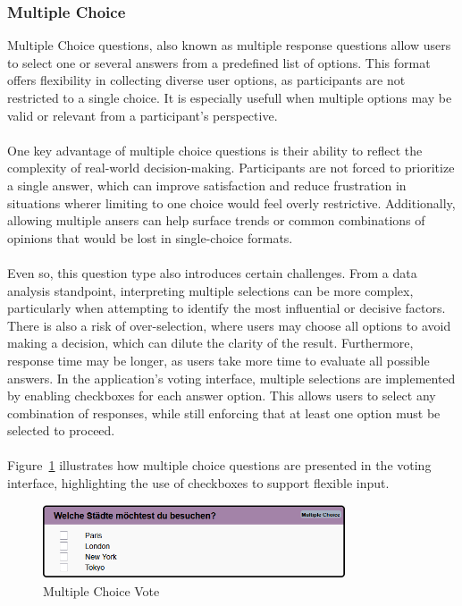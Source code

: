 \documentclass[a4paper,12pt]{report}
\begin{document}
\subsubsection{Multiple Choice}
Multiple Choice questions, also known as multiple response questions allow users to select one or several answers from a predefined list of options. This format offers flexibility in collecting diverse user options, as participants are not restricted to a single choice. It is especially usefull when multiple options may be valid or relevant from a participant's perspective.\\\\
One key advantage of multiple choice questions is their ability to reflect the complexity of real-world decision-making. Participants are not forced to prioritize a single answer, which can improve satisfaction and reduce frustration in situations wherer limiting to one choice would feel overly restrictive. Additionally, allowing multiple ansers can help surface trends or common combinations of opinions that would be lost in single-choice formats. \parencite{singlevsmultiple}\\\\
Even so, this question type also introduces certain challenges. From a data analysis standpoint, interpreting multiple selections can be more complex, particularly when attempting to identify the most influential or decisive factors. There is also a risk of over-selection, where users may choose all options to avoid making a decision, which can dilute the clarity of the result. Furthermore, response time may be longer, as users take more time to evaluate all possible answers. \parencite{singlevsmultiple}
In the application's voting interface, multiple selections are implemented by enabling checkboxes for each answer option. This allows users to select any combination of responses, while still enforcing that at least one option must be selected to proceed.\\\\
Figure~\ref{fig:multiplechoice} illustrates how multiple choice questions are presented in the voting interface, highlighting the use of checkboxes to support flexible input.
\begin{figure}[H]	
	\centering	
	\includegraphics[width=0.8\textwidth]{pics/Multiple_Choice.png}	
	\caption{Multiple Choice Vote}	
	\label{fig:multiplechoice}
\end{figure}
\end{document}
